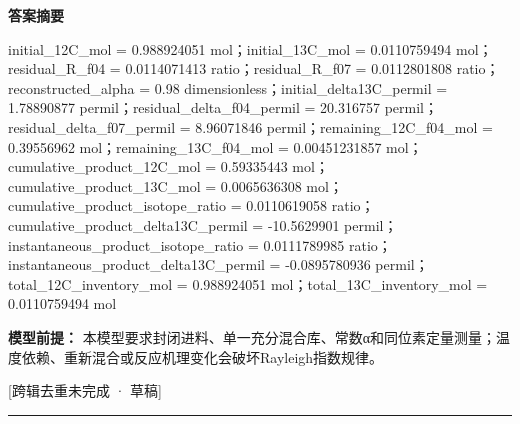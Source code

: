 \documentclass[UTF8,11pt,a4paper]{ctexart}
\begin{document}
\noindent\textbf{答案摘要}\par
initial\_12C\_mol = 0.988924051 mol；initial\_13C\_mol = 0.0110759494 mol；residual\_R\_f04 = 0.0114071413 ratio；residual\_R\_f07 = 0.0112801808 ratio；reconstructed\_alpha = 0.98 dimensionless；initial\_delta13C\_permil = 1.78890877 permil；residual\_delta\_f04\_permil = 20.316757 permil；residual\_delta\_f07\_permil = 8.96071846 permil；remaining\_12C\_f04\_mol = 0.39556962 mol；remaining\_13C\_f04\_mol = 0.00451231857 mol；cumulative\_product\_12C\_mol = 0.59335443 mol；cumulative\_product\_13C\_mol = 0.0065636308 mol；cumulative\_product\_isotope\_ratio = 0.0110619058 ratio；cumulative\_product\_delta13C\_permil = -10.5629901 permil；instantaneous\_product\_isotope\_ratio = 0.0111789985 ratio；instantaneous\_product\_delta13C\_permil = -0.0895780936 permil；total\_12C\_inventory\_mol = 0.988924051 mol；total\_13C\_inventory\_mol = 0.0110759494 mol\par
\noindent\textbf{模型前提：}
本模型要求封闭进料、单一充分混合库、常数α和同位素定量测量；温度依赖、重新混合或反应机理变化会破坏Rayleigh指数规律。\par
\noindent\textcolor{red!65!black}{[跨辑去重未完成 · 草稿]} \par
\medskip\hrule\medskip
{}
\end{document}
